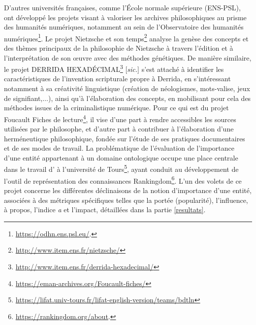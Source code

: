 D'autres universités françaises, comme l'École normale supérieure (\textsc{ENS-PSL}), ont développé les projets visant à valoriser les archives philosophiques au prisme des humanités numériques, notamment au sein de l'Observatoire des humanités numériques\footnote{\url{https://odhn.ens.psl.eu/}.}. Le projet \og{}Nietzsche et son temps\fg{}\footnote{\url{http://www.item.ens.fr/nietzsche/}} analyse la genèse des concepts et des thèmes principaux de la philosophie de Nietzsche à travers l'édition et à l’interprétation de son \oe{}uvre avec des méthodes génétiques. De manière similaire, le projet \og{}DERRIDA HEXADÉCIMAL\fg{}\footnote{\url{http://www.item.ens.fr/derrida-hexadecimal/}} [\textit{sic.}] s'est attaché à identifier les caractéristiques de l'invention scripturale propre à Derrida, en s'intéressant notamment à sa créativité linguistique (création de néologismes, mots-valise, jeux de signifiant,$\dots$), ainsi qu'à l'élaboration des concepts, en mobilisant pour cela des méthodes issues de la criminalistique numérique. Pour ce qui est du projet \og{}Foucault Fiches de lecture\fg{}\footnote{\url{https://eman-archives.org/Foucault-fiches/}}, il vise d'une part à rendre accessibles les sources utilisées par le philosophe, et d'autre part à contribuer à l'élaboration d'une herméneutique philosophique, fondée sur l'étude de ses pratiques documentaires et de ses modes de travail. La problématique de l'évaluation de l'importance d'une entité appartenant à un domaine ontologique occupe une place centrale dans le travail d'\citet{abdallah2025rankingdom} à l'université de Tours\footnote{\url{https://lifat.univ-tours.fr/lifat-english-version/teams/bdtln}}, ayant conduit au développement de l'outil de représentation des connaissances Rankingdom\footnote{\url{https://rankingdom.org/about}.}. L'un des volets de ce projet concerne les différentes déclinaisons de la notion d'importance d'une entité, associées à des métriques spécifiques telles que la portée (popularité), l'influence, \og{}à propos\fg{}, l'indice \textit{a} et l'impact, détaillées dans la partie \ref{resultats}.

